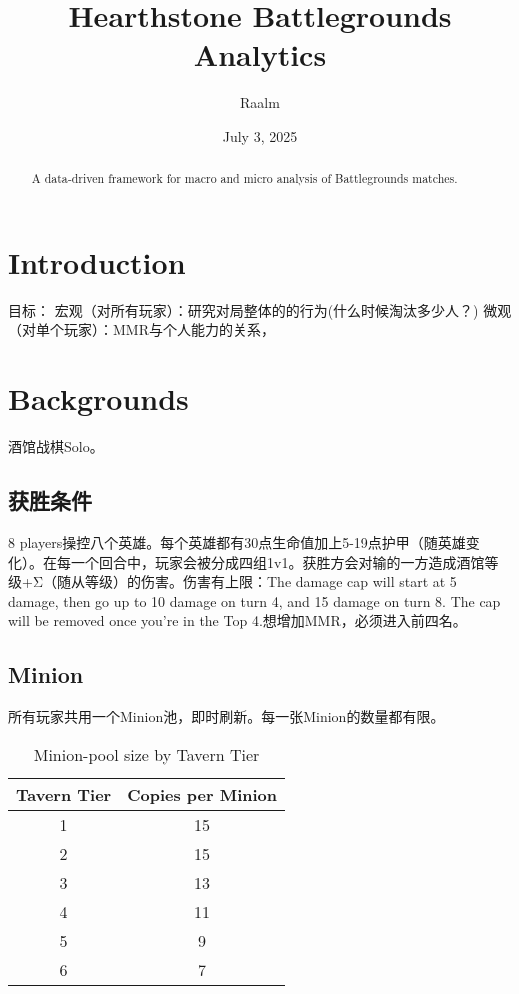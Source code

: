 \documentclass[UTF8]{ctexart}
\title{Hearthstone Battlegrounds Analytics}
\author{Raalm}
\date{July 3, 2025}
\begin{document}
\maketitle

\begin{abstract}
A data‐driven framework for macro and micro analysis of Battlegrounds matches.
\end{abstract}

\section{Introduction}
目标：
宏观（对所有玩家）：研究对局整体的的行为(什么时候淘汰多少人？)
微观（对单个玩家）：MMR与个人能力的关系，

\section{Backgrounds}
酒馆战棋Solo。

\subsection{获胜条件}
8 players操控八个英雄。每个英雄都有30点生命值加上5-19点护甲（随英雄变化）。在每一个回合中，玩家会被分成四组1v1。获胜方会对输的一方造成酒馆等级+Σ（随从等级）的伤害。伤害有上限：The damage cap will start at 5 damage, then go up to 10 damage on turn 4, and 15 damage on turn 8. The cap will be removed once you’re in the Top 4.想增加MMR，必须进入前四名。

\subsection{Minion}
所有玩家共用一个Minion池，即时刷新。每一张Minion的数量都有限。
\begin{table}[ht]
  \centering
  \caption{Minion-pool size by Tavern Tier}
  \label{tab:tier_pool_size}
  \begin{tabular}{cc}
    \toprule
    Tavern Tier & Copies per Minion \\
    \midrule
     1 & 15 \\
     2 & 15 \\
     3 & 13 \\
     4 & 11 \\
     5 &  9 \\
     6 &  7 \\
    \bottomrule
  \end{tabular}
\end{table}
\end{document}
